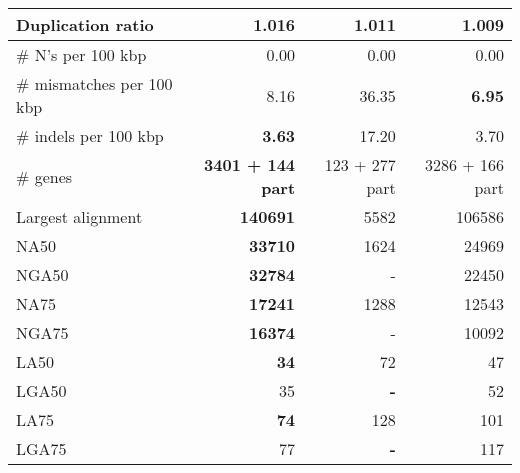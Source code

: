 \documentclass[12pt,a4paper]{article}
\begin{document}
\begin{table}[ht]
\begin{center}
\begin{tabular}{|l*{3}{|r}|}
Duplication ratio & 1.016 & 1.011 & {\bf 1.009} \\ \hline
\# N's per 100 kbp & 0.00 & 0.00 & 0.00 \\ \hline
\# mismatches per 100 kbp & 8.16 & 36.35 & {\bf 6.95} \\ \hline
\# indels per 100 kbp & {\bf 3.63} & 17.20 & 3.70 \\ \hline
\# genes & {\bf 3401 + 144 part} & 123 + 277 part & 3286 + 166 part \\ \hline
Largest alignment & {\bf 140691} & 5582 & 106586 \\ \hline
NA50 & {\bf 33710} & 1624 & 24969 \\ \hline
NGA50 & {\bf 32784} & - & 22450 \\ \hline
NA75 & {\bf 17241} & 1288 & 12543 \\ \hline
NGA75 & {\bf 16374} & - & 10092 \\ \hline
LA50 & {\bf 34} & 72 & 47 \\ \hline
LGA50 & 35 & {\bf -} & 52 \\ \hline
LA75 & {\bf 74} & 128 & 101 \\ \hline
LGA75 & 77 & {\bf -} & 117 \\ \hline
\end{tabular}
\end{center}
\end{table}
\end{document}
